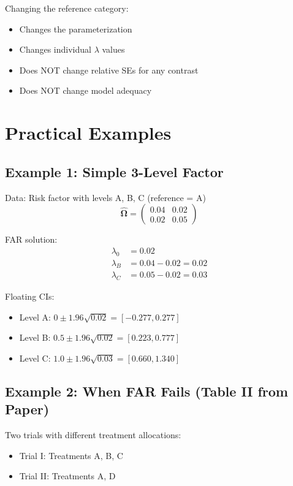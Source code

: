 \documentclass[11pt]{article}
\begin{document}
Changing the reference category:
\begin{itemize}
    \item Changes the parameterization
    \item Changes individual $\lambda$ values
    \item Does NOT change relative SEs for any contrast
    \item Does NOT change model adequacy
\end{itemize}

\section{Practical Examples}

\subsection{Example 1: Simple 3-Level Factor}

Data: Risk factor with levels A, B, C (reference = A)
\begin{equation}
    \hat{\boldsymbol{\Omega}} = \begin{pmatrix}
        0.04 & 0.02 \\
        0.02 & 0.05
    \end{pmatrix}
\end{equation}

FAR solution:
\begin{align}
    \lambda_0 &= 0.02 \\
    \lambda_B &= 0.04 - 0.02 = 0.02 \\
    \lambda_C &= 0.05 - 0.02 = 0.03
\end{align}

Floating CIs:
\begin{itemize}
    \item Level A: $0 \pm 1.96\sqrt{0.02} = [-0.277, 0.277]$
    \item Level B: $0.5 \pm 1.96\sqrt{0.02} = [0.223, 0.777]$
    \item Level C: $1.0 \pm 1.96\sqrt{0.03} = [0.660, 1.340]$
\end{itemize}

\subsection{Example 2: When FAR Fails (Table II from Paper)}

Two trials with different treatment allocations:
\begin{itemize}
    \item Trial I: Treatments A, B, C
    \item Trial II: Treatments A, D
\end{itemize}
\end{document}
